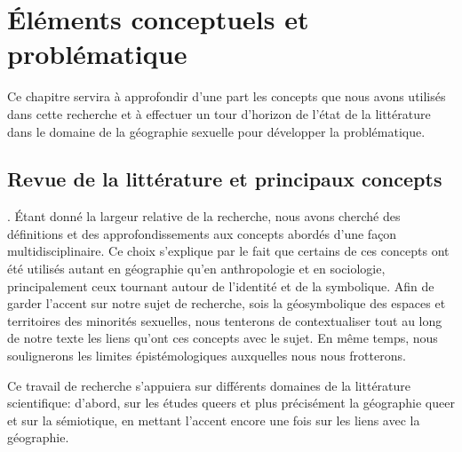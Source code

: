 \chapter{Éléments conceptuels et problématique}
\label{cha:elements_conceptuels_et_problematique}


Ce chapitre servira à approfondir d'une part les concepts que nous avons utilisés dans cette recherche et à effectuer un tour d'horizon de l'état de la littérature dans le domaine de la géographie sexuelle pour développer la problématique.

\section{Revue de la littérature et principaux concepts}
\label{sec:revue_de_la_litterature_et_principaux_concepts} 

.
Étant donné la largeur relative de la recherche, nous avons cherché des définitions et des approfondissements aux concepts abordés d'une façon multidisciplinaire. 
Ce choix s'explique par le fait que certains de ces concepts ont été utilisés autant en géographie qu'en anthropologie et en sociologie, principalement ceux tournant autour de l'identité et de la symbolique. 
Afin de garder l’accent sur notre sujet de recherche, sois la géosymbolique des espaces et territoires des minorités sexuelles, nous tenterons de contextualiser tout au long de notre texte les liens qu'ont ces concepts avec le sujet. 
En même temps, nous soulignerons les limites épistémologiques auxquelles nous nous frotterons. 

Ce travail de recherche s’appuiera sur différents domaines de la littérature scientifique: d'abord, sur les études queers et plus précisément la géographie queer et sur la sémiotique, en mettant l'accent encore une fois sur les liens avec la géographie. 

